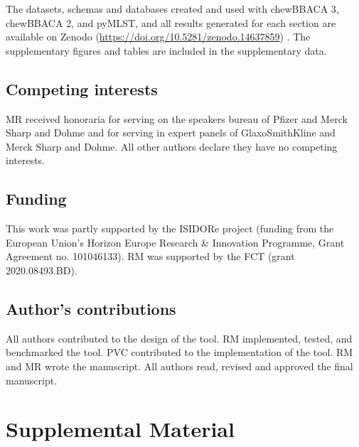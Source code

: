 The datasets, schemas and databases created and used with chewBBACA 3, chewBBACA 2, and pyMLST, and all results generated for each section are available on Zenodo (\url{https://doi.org/10.5281/zenodo.14637859}) \citep{mamede_supplementary_2025}. The supplementary figures and tables are included in the supplementary data.

\subsection{Competing interests} \label{ssec:declarations_ssec4}

MR received honoraria for serving on the speakers bureau of Pfizer and Merck Sharp and Dohme and for serving in expert panels of GlaxoSmithKline and Merck Sharp and Dohme. All other authors declare they have no competing interests.

\subsection{Funding} \label{ssec:declarations_ssec5}

This work was partly supported by the ISIDORe project (funding from the European Union’s Horizon Europe Research \& Innovation Programme, Grant Agreement no. 101046133). RM was supported by the \ac{FCT} (grant 2020.08493.BD).

\subsection{Author’s contributions} \label{ssec:declarations_ssec6}

All authors contributed to the design of the tool. RM implemented, tested, and benchmarked the tool. PVC contributed to the implementation of the tool. RM and MR wrote the manuscript. All authors read, revised and approved the final manuscript.




\newpage

\section{Supplemental Material}

